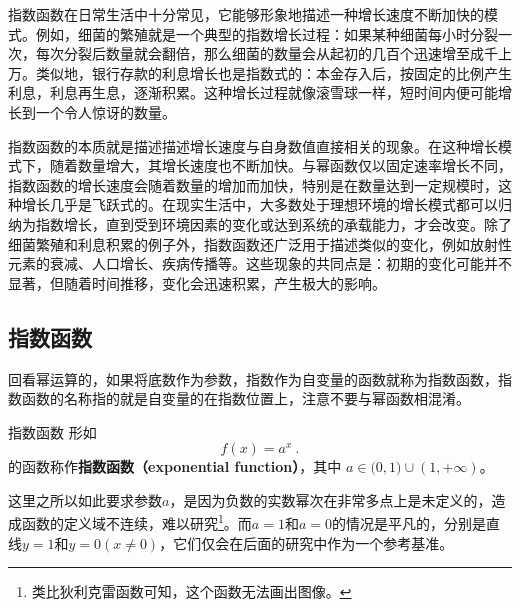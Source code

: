 
\begin{issues}
\issueDraft
\end{issues}



指数函数在日常生活中十分常见，它能够形象地描述一种增长速度不断加快的模式。例如，细菌的繁殖就是一个典型的指数增长过程：如果某种细菌每小时分裂一次，每次分裂后数量就会翻倍，那么细菌的数量会从起初的几百个迅速增至成千上万。类似地，银行存款的利息增长也是指数式的：本金存入后，按固定的比例产生利息，利息再生息，逐渐积累。这种增长过程就像滚雪球一样，短时间内便可能增长到一个令人惊讶的数量。

指数函数的本质就是描述描述增长速度与自身数值直接相关的现象。在这种增长模式下，随着数量增大，其增长速度也不断加快。与幂函数仅以固定速率增长不同，指数函数的增长速度会随着数量的增加而加快，特别是在数量达到一定规模时，这种增长几乎是飞跃式的。在现实生活中，大多数处于理想环境的增长模式都可以归纳为指数增长，直到受到环境因素的变化或达到系统的承载能力，才会改变。除了细菌繁殖和利息积累的例子外，指数函数还广泛用于描述类似的变化，例如放射性元素的衰减、人口增长、疾病传播等。这些现象的共同点是：初期的变化可能并不显著，但随着时间推移，变化会迅速积累，产生极大的影响。

\subsection{指数函数}

回看幂运算的，如果将底数作为参数，指数作为自变量的函数就称为指数函数，指数函数的名称指的就是自变量的在指数位置上，注意不要与幂函数相混淆。

\begin{definition}{指数函数}
形如
\begin{equation}
f(x) = a^x~.
\end{equation}
的函数称作\textbf{指数函数（exponential function）}，其中 $a\in\mathbb (0,1)\cup(1,+\infty)$。
\end{definition}

这里之所以如此要求参数$a$，是因为负数的实数幂次在非常多点上是未定义的，造成函数的定义域不连续，难以研究\footnote{类比狄利克雷函数可知，这个函数无法画出图像。}。而$a=1$和$a=0$的情况是平凡的，分别是直线$y=1$和$y=0(x\neq0)$，它们仅会在后面的研究中作为一个参考基准。

